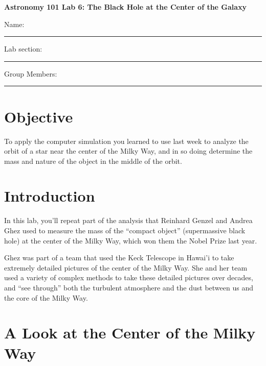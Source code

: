 \documentclass[11pt]{article}
\begin{document}
\begin{center}
\textbf{\Large
\vspace*{0.1cm}
Astronomy 101 Lab 6: The Black Hole at the Center of the Galaxy
}
\end{center}

\vspace*{0.5cm}

{\Large Name:}\vspace*{0.5cm}\\\hrule
{\Large Lab section:}\vspace*{0.5cm}\\\hrule
{\Large Group Members:}\vspace*{0.5cm}\\\hrule
\vspace*{0.5cm}


\section{Objective}

To apply the computer simulation you learned to use last week to analyze the orbit of a star near the center of the Milky Way, and in so doing determine the mass and nature of the object in the middle of the orbit.



\section{Introduction}
In this lab, you’ll repeat part of the analysis that Reinhard Genzel and Andrea Ghez used to measure the mass of the “compact object” (supermassive black hole) at the center of the Milky Way, which won them the Nobel Prize last year.

Ghez was part of a team that used the Keck Telescope in Hawai’i to take extremely detailed pictures of the center of the Milky Way. She and her team used a variety of complex methods to take these detailed pictures over decades, and “see through” both the turbulent atmosphere and the dust between us and the core of the Milky Way.



\section{A Look at the Center of the Milky Way}
\end{document}
